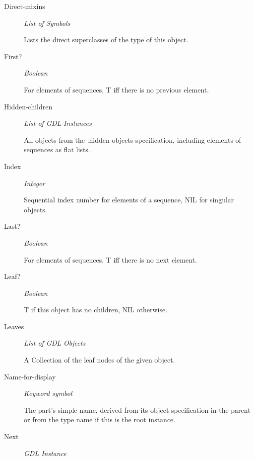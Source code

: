 \documentclass [11pt]{book}
\begin{document}
\begin{itemize}
\begin{description}
\item [Direct-mixins]
\emph{List of Symbols}

 Lists the direct superclasses of the type of this object.




\item [First?]
\emph{Boolean}

 For elements of sequences, T iff there is no previous element.




\item [Hidden-children]
\emph{List of GDL Instances}

 All objects from the :hidden-objects specification, including elements of sequences
as flat lists.




\item [Index]
\emph{Integer}

 Sequential index number for elements of a sequence, NIL for singular objects.




\item [Last?]
\emph{Boolean}

 For elements of sequences, T iff there is no next element.




\item [Leaf?]
\emph{Boolean}

 T if this object has no children, NIL otherwise.




\item [Leaves]
\emph{List of GDL Objects}

 A Collection of the leaf nodes of the given object.




\item [Name-for-display]
\emph{Keyword symbol}

 The part's simple name, derived from its object specification in the parent or from
the type name if this is the root instance.




\item [Next]
\emph{GDL Instance}


\end{description}
\end{itemize}
\end{document}
